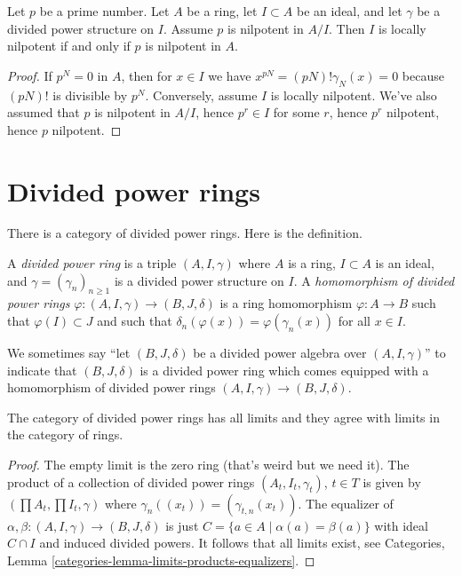 \begin{lemma}
\label{lemma-nil}
Let $p$ be a prime number. Let $A$ be a ring, let $I \subset A$ be an ideal,
and let $\gamma$ be a divided power structure on $I$. Assume $p$ is nilpotent
in $A/I$. Then $I$ is locally nilpotent if and only if $p$ is nilpotent in $A$.
\end{lemma}

\begin{proof}
If $p^N = 0$ in $A$, then for $x \in I$ we have
$x^{pN} = (pN)!\gamma_N(x) = 0$ because $(pN)!$ is
divisible by $p^N$. Conversely, assume $I$ is locally nilpotent.
We've also assumed that $p$ is nilpotent in $A/I$, hence
$p^r \in I$ for some $r$, hence $p^r$ nilpotent, hence $p$ nilpotent.
\end{proof}








\section{Divided power rings}
\label{section-divided-power-rings}

\noindent
There is a category of divided power rings.
Here is the definition.

\begin{definition}
\label{definition-divided-power-ring}
A {\it divided power ring} is a triple $(A, I, \gamma)$ where
$A$ is a ring, $I \subset A$ is an ideal, and $\gamma = (\gamma_n)_{n \geq 1}$
is a divided power structure on $I$.
A {\it homomorphism of divided power rings}
$\varphi : (A, I, \gamma) \to (B, J, \delta)$ is a ring homomorphism
$\varphi : A \to B$ such that $\varphi(I) \subset J$ and such that
$\delta_n(\varphi(x)) = \varphi(\gamma_n(x))$ for all $x \in I$.
\end{definition}

\noindent
We sometimes say ``let $(B, J, \delta)$ be a divided power algebra over
$(A, I, \gamma)$'' to indicate that $(B, J, \delta)$ is a divided power ring
which comes equipped with a homomorphism of divided power rings
$(A, I, \gamma) \to (B, J, \delta)$.

\begin{lemma}
\label{lemma-limits}
The category of divided power rings has all limits and they agree with
limits in the category of rings.
\end{lemma}

\begin{proof}
The empty limit is the zero ring (that's weird but we need it).
The product of a collection of divided power rings $(A_t, I_t, \gamma_t)$,
$t \in T$ is given by $(\prod A_t, \prod I_t, \gamma)$ where
$\gamma_n((x_t)) = (\gamma_{t, n}(x_t))$.
The equalizer of $\alpha, \beta : (A, I, \gamma) \to (B, J, \delta)$
is just $C = \{a \in A \mid \alpha(a) = \beta(a)\}$ with ideal $C \cap I$
and induced divided powers. It follows that all limits exist, see
Categories, Lemma \ref{categories-lemma-limits-products-equalizers}.
\end{proof}


